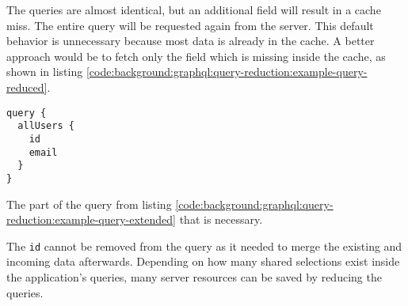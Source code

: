 \noindent The queries are almost identical, but an additional field will result in a cache miss. The entire query will be requested again from the server. This default behavior is unnecessary because most data is already in the cache. A better approach would be to fetch only the field which is missing inside the cache, as shown in listing \ref{code:background:graphql:query-reduction:example-query-reduced}.

\ifshowListings
\begin{listing}[H]
    \begin{verbatim}
query {
  allUsers {
    id
    email
  }
}
    \end{verbatim}
    \caption{The part of the query from listing \ref{code:background:graphql:query-reduction:example-query-extended} that is necessary.}\label{code:background:graphql:query-reduction:example-query-reduced}
\end{listing}
\fi

\noindent The \texttt{id} cannot be removed from the query as it needed to merge the existing and incoming data afterwards. Depending on how many shared selections exist inside the application's queries, many server resources can be saved by reducing the queries.
